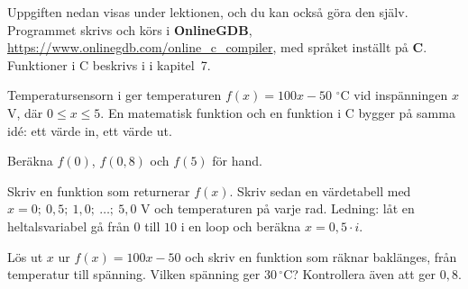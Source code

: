 Uppgiften nedan visas under lektionen, och du kan också göra den själv. Programmet skrivs och körs i
\textbf{OnlineGDB}, \url{https://www.onlinegdb.com/online_c_compiler}, med språket inställt på
\textbf{C}. Funktioner i C beskrivs i  i kapitel~7.

Temperatursensorn i  ger temperaturen $f(x) = 100x - 50$ $^{\circ}$C vid
inspänningen $x$ V, där $0 \leq x \leq 5$. En matematisk funktion och en funktion i C bygger på
samma idé: ett värde in, ett värde ut.
\begin{parts}
  \item Beräkna $f(0)$, $f(0{,}8)$ och $f(5)$ för hand.
  \item Skriv en funktion  som returnerar $f(x)$. Skriv
    sedan en värdetabell med $x = 0;\ 0{,}5;\ 1{,}0;\ \ldots;\ 5{,}0$ V och temperaturen på varje
    rad. Ledning: låt en heltalsvariabel  gå från $0$ till $10$ i en loop och beräkna
    $x = 0{,}5 \cdot i$.
  \item Lös ut $x$ ur $f(x) = 100x - 50$ och skriv en funktion
     som räknar baklänges, från temperatur till spänning.
    Vilken spänning ger $30\,^{\circ}$C? Kontrollera även att  ger
    $0{,}8$.
\end{parts}
